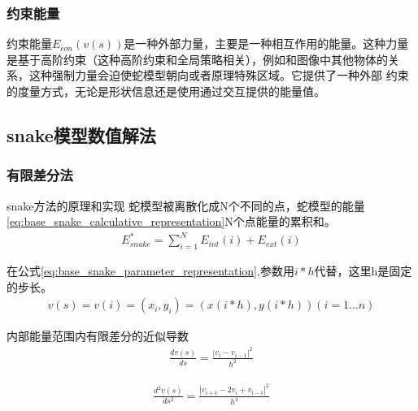 \subsubsection{约束能量}
约束能量$E_{con}(v(s))$是一种外部力量，主要是一种相互作用的能量。这种力量是基于高阶约束（这种高阶约束和全局策略相关），例如和图像中其他物体的关系，这种强制力量会迫使蛇模型朝向或者原理特殊区域。它提供了一种外部
约束的度量方式，无论是形状信息还是使用通过交互提供的能量值。


\subsection{snake模型数值解法}
\subsubsection{有限差分法}
snake方法的原理和实现
蛇模型被离散化成N个不同的点，蛇模型的能量\eqref{eq:base_snake_calculative_representation}N个点能量的累积和。
\begin{align}\label{eq:snake_energy_discrete_representation}
E_{snake}^{*} = \sum_{i=1}^{N}E_{int}(i)+E_{ext}(i)
\end{align}

在公式\eqref{eq:base_snake_parameter_representation},参数用$i*h$代替，这里h是固定的步长。
\begin{align}\label{eq:snake_parameter_discrete_representation}
v(s)=v(i)=(x_{i},y_{i})=(x(i*h),y(i*h)) (i=1 \ldots n)
\end{align}

内部能量范围内有限差分的近似导数
\begin{align}\label{eq:simple_parameter_derivative_first_order}
\frac{dv(s)}{ds} = \frac{|v_{i}-v_{i-1}|^{2}}{h^{2}}
\end{align}

\begin{align}\label{eq:simple_parameter_derivative_second_order}
\frac{d^{2}v(s)}{ds^{2}} = \frac{|v_{i+1}-2v_{i}+v_{i-1}|^{2}}{h^{4}}
\end{align}

